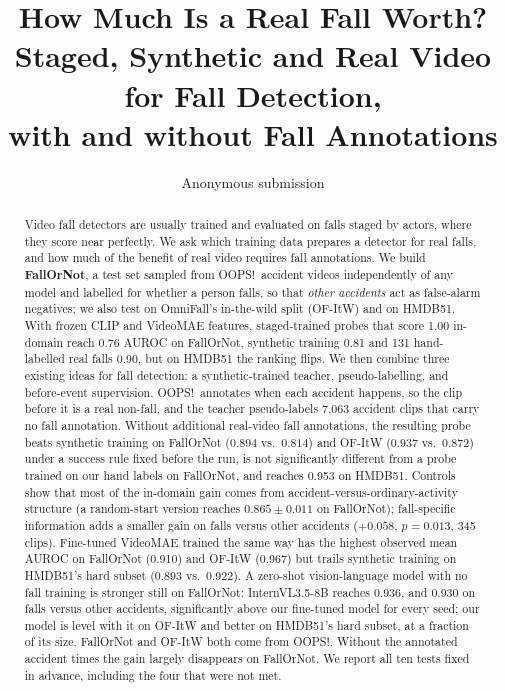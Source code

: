 \documentclass[10pt,twocolumn,letterpaper]{article}
\title{\Large\bf How Much Is a Real Fall Worth?\\Staged, Synthetic and Real Video for Fall Detection,\\with and without Fall Annotations}
\author{Anonymous submission}
\date{}
\begin{document}
\maketitle

\begin{abstract}
Video fall detectors are usually trained and evaluated on falls staged by actors, where they score near perfectly. We ask which training data prepares a detector for real falls, and how much of the benefit of real video requires fall annotations. We build \textbf{FallOrNot}, a test set sampled from OOPS!\ accident videos independently of any model and labelled for whether a person falls, so that \emph{other accidents} act as false-alarm negatives; we also test on OmniFall's in-the-wild split (OF-ItW) and on HMDB51. With frozen CLIP and VideoMAE features, staged-trained probes that score 1.00 in-domain reach 0.76 AUROC on FallOrNot, synthetic training 0.81 and 131 hand-labelled real falls 0.90, but on HMDB51 the ranking flips. We then combine three existing ideas for fall detection: a synthetic-trained teacher, pseudo-labelling, and before-event supervision. OOPS!\ annotates when each accident happens, so the clip before it is a real non-fall, and the teacher pseudo-labels 7,063 accident clips that carry no fall annotation. Without additional real-video fall annotations, the resulting probe beats synthetic training on FallOrNot ($0.894$ vs.\ $0.814$) and OF-ItW ($0.937$ vs.\ $0.872$) under a success rule fixed before the run, is not significantly different from a probe trained on our hand labels on FallOrNot, and reaches 0.953 on HMDB51. Controls show that most of the in-domain gain comes from accident-versus-ordinary-activity structure (a random-start version reaches $0.865\pm0.011$ on FallOrNot); fall-specific information adds a smaller gain on falls versus other accidents ($+0.058$, $p=0.013$, 345 clips). Fine-tuned VideoMAE trained the same way has the highest observed mean AUROC on FallOrNot (0.910) and OF-ItW (0.967) but trails synthetic training on HMDB51's hard subset (0.893 vs.\ 0.922). A zero-shot vision-language model with no fall training is stronger still on FallOrNot: InternVL3.5-8B reaches 0.936, and 0.930 on falls versus other accidents, significantly above our fine-tuned model for every seed; our model is level with it on OF-ItW and better on HMDB51's hard subset, at a fraction of its size. FallOrNot and OF-ItW both come from OOPS!. Without the annotated accident times the gain largely disappears on FallOrNot. We report all ten tests fixed in advance, including the four that were not met.
\end{abstract}
\end{document}
